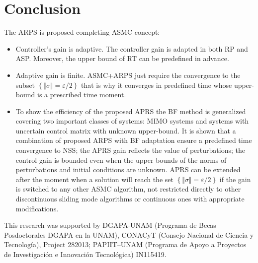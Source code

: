 \documentclass[twocolumn]{autart}    %
\begin{document}
\section{Conclusion}
\vspace{-3mm}
The ARPS is proposed completing ASMC concept:
\begin{itemize}
\item Controller's gain is adaptive.  The controller gain is adapted in both RP and ASP. Moreover, the upper bound of RT can be predefined in advance. 
\item Adaptive gain is finite.  ASMC+ARPS just require the convergence to the subset $\left\lbrace \Vert \sigma \Vert=\varepsilon /2 \right\rbrace$ that is why it converges in predefined time whose upper-bound is a prescribed time moment.
\item {To show the efficiency of the proposed APRS the BF method is generalized covering two important classes of systems: MIMO systems and systems with uncertain control matrix with unknown upper-bound. It is shown that a combination of proposed ARPS with BF adaptation ensure a predefined time convergence to NSS; the APRS gain reflects the value of perturbations; the control gain is bounded even when the upper bounds of the norms of perturbations and initial conditions are unknown. APRS can be extended after the moment when a solution will reach the set $\left \lbrace \Vert \sigma \Vert= \varepsilon/2\right \rbrace$ if the gain is switched to any other ASMC algorithm, not restricted directly to other discontinuous sliding mode algorithms or continuous ones with appropriate modifications.}
\end{itemize}
\vspace{-2mm}
\begin{ack}      
\vspace{-3mm}                     
This research was supported by DGAPA-UNAM (Programa de Becas Posdoctorales DGAPA en la UNAM), CONACyT (Consejo Nacional de Ciencia y Tecnolog\'ia), Project 282013; PAPIIT--UNAM (Programa de Apoyo a Proyectos de Investigaci\'on e Innovaci\'on Tecnol\'ogica) IN115419.
\end{ack}

\appendix 
\vspace{-3mm}
\end{document}
